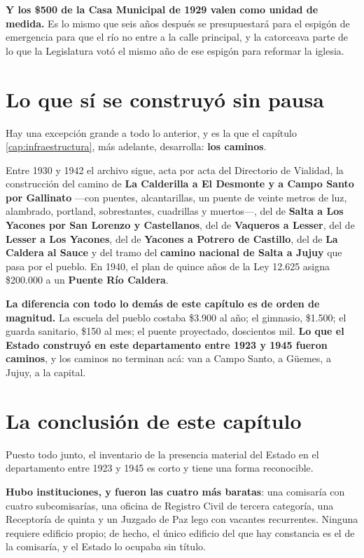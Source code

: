 \textbf{Y los \$500 de la Casa Municipal de 1929 valen como unidad de medida.} Es lo mismo que
seis años después se presupuestará para el espigón de emergencia para que el río no entre a la calle
principal, y la catorceava parte de lo que la Legislatura votó el mismo año de ese espigón para
reformar la iglesia.

\section{Lo que sí se construyó sin pausa}

Hay una excepción grande a todo lo anterior, y es la que el capítulo \ref{cap:infraestructura}, más adelante,
desarrolla: \textbf{los caminos}.

Entre 1930 y 1942 el archivo sigue, acta por acta del Directorio de Vialidad, la construcción
del camino de \textbf{La Calderilla a El Desmonte y a Campo Santo por Gallinato} ---con puentes,
alcantarillas, un puente de veinte metros de luz, alambrado, portland, sobrestantes, cuadrillas
y muertos---, del de \textbf{Salta a Los Yacones por San Lorenzo y Castellanos}, del de
\textbf{Vaqueros a Lesser}, del de \textbf{Lesser a Los Yacones}, del de \textbf{Yacones a
Potrero de Castillo}, del de \textbf{La Caldera al Sauce} y del tramo del \textbf{camino nacional
de Salta a Jujuy} que pasa por el pueblo. En 1940, el plan de quince años de la Ley 12.625
asigna \$200.000 a un \textbf{Puente Río Caldera}.

\textbf{La diferencia con todo lo demás de este capítulo es de orden de magnitud.} La escuela
del pueblo costaba \$3.900 al año; el gimnasio, \$1.500; el guarda sanitario, \$150 al mes; el
puente proyectado, doscientos mil. \textbf{Lo que el Estado construyó en este departamento entre
1923 y 1945 fueron caminos}, y los caminos no terminan acá: van a Campo Santo, a Güemes, a
Jujuy, a la capital.

\section{La conclusión de este capítulo}

Puesto todo junto, el inventario de la presencia material del Estado en el departamento entre
1923 y 1945 es corto y tiene una forma reconocible.

\textbf{Hubo instituciones, y fueron las cuatro más baratas}: una comisaría con cuatro
subcomisarías, una oficina de Registro Civil de tercera categoría, una Receptoría de quinta y
un Juzgado de Paz lego con vacantes recurrentes. Ninguna requiere edificio propio; de hecho, el
único edificio del que hay constancia es el de la comisaría, y el Estado lo ocupaba sin título.

